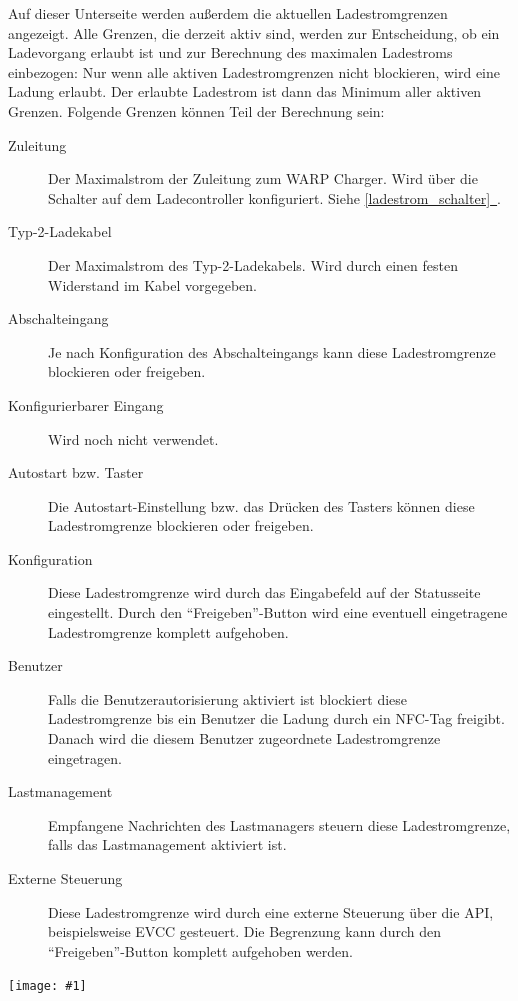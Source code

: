 \documentclass[a4paper,10pt]{article}
\newcommand{\gfx}[1]{\texttt{[image: \#1]}}
\newcommand*{\fullref}[1]{\hyperref[{#1}]{\ref*{#1}~\nameref*{#1}}}
\begin{document}
\begin{multicols*}{2}
	Auf dieser Unterseite werden außerdem die aktuellen Ladestromgrenzen angezeigt. Alle Grenzen, die
	derzeit aktiv sind, werden zur Entscheidung, ob ein Ladevorgang erlaubt ist und zur Berechnung des maximalen Ladestroms einbezogen:
	Nur wenn alle aktiven Ladestromgrenzen nicht blockieren, wird eine Ladung erlaubt.
	Der erlaubte Ladestrom ist dann das Minimum aller aktiven Grenzen. Folgende Grenzen können Teil der Berechnung sein:

	\begin{description}
		\item[Zuleitung] Der Maximalstrom der Zuleitung zum WARP Charger.
			Wird über die Schalter auf dem Ladecontroller konfiguriert. Siehe \fullref{ladestrom_schalter}.
		\item[Typ-2-Ladekabel] Der Maximalstrom des Typ-2-Ladekabels. Wird durch einen festen Widerstand im Kabel vorgegeben.
		\item[Abschalteingang] Je nach Konfiguration des Abschalteingangs kann diese Ladestromgrenze blockieren oder freigeben.
		\item[Konfigurierbarer Eingang] Wird noch nicht verwendet.
		\item[Autostart bzw. Taster] Die Autostart-Einstellung bzw. das Drücken des Tasters können diese Ladestromgrenze blockieren oder freigeben.
		\item[Konfiguration] Diese Ladestromgrenze wird durch das Eingabefeld auf der Statusseite eingestellt.
			Durch den \enquote{Freigeben}-Button wird eine eventuell eingetragene Ladestromgrenze komplett aufgehoben.
		\item[Benutzer] Falls die Benutzerautorisierung aktiviert ist blockiert diese Ladestromgrenze bis ein Benutzer die Ladung durch ein NFC-Tag freigibt.
			Danach wird die diesem Benutzer zugeordnete Ladestromgrenze eingetragen.
		\item[Lastmanagement] Empfangene Nachrichten des Lastmanagers steuern diese Ladestromgrenze, falls das Lastmanagement aktiviert ist.
		\item[Externe Steuerung] Diese Ladestromgrenze wird durch eine externe Steuerung über die API, beispielsweise EVCC gesteuert.
			Die Begrenzung kann durch den \enquote{Freigeben}-Button komplett aufgehoben werden.
	\end{description}

	\gfx{./img_warp2/resized/web_evse2}


\end{multicols*}
\end{document}

